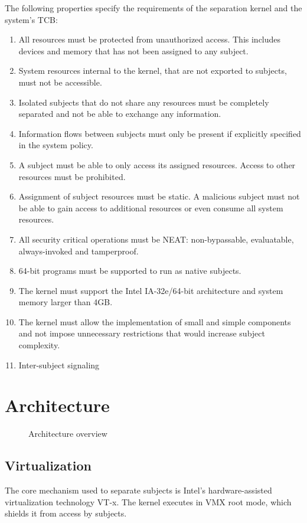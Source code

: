 The following properties specify the requirements of the separation kernel and
the system's TCB:
\begin{enumerate}
	\item All resources must be protected from unauthorized access. This
		includes devices and memory that has not been assigned to any subject.
	\item System resources internal to the kernel, that are not exported to
		subjects, must not be accessible.
	\item Isolated subjects that do not share any resources must be completely
		separated and not be able to exchange any information.
	\item Information flows between subjects must only be present if explicitly
		specified in the system policy.
	\item A subject must be able to only access its assigned resources. Access
		to other resources must be prohibited.
	\item Assignment of subject resources must be static. A malicious subject
		must not be able to gain access to additional resources or even consume
		all system resources.
	\item All security critical operations must be NEAT: non-bypassable,
		evaluatable, always-invoked and tamperproof.
	\item 64-bit programs must be supported to run as native subjects.
	\item The kernel must support the Intel IA-32e/64-bit architecture and
		system memory larger than 4GB.
	\item The kernel must allow the implementation of small and simple
		components and not impose unnecessary restrictions that would increase
		subject complexity.
	\item Inter-subject signaling
\end{enumerate}

\section{Architecture}
\begin{figure}[h]
	\centering
	
	\caption{Architecture overview}
	\label{fig:architecture-overview}
\end{figure}

\subsection{Virtualization}
The core mechanism used to separate subjects is Intel's hardware-assisted
virtualization technology VT-x. The kernel executes in VMX root mode, which
shields it from access by subjects.

